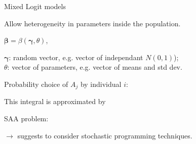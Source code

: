 \documentclass{beamer}
\def\bxi{\boldsymbol\xi}
\begin{document}

	\begin{frame}{Mixed Logit models}
		
		\begin{footnotesize}
			Allow {\red heterogeneity} in parameters inside the population.
			\begin{center}
				$\boldsymbol{\beta} = \beta(\boldsymbol{\gamma}, \theta)$,
			\end{center}
			$\boldsymbol{\gamma}$: {\blue random vector}, e.g. vector of independant
			$N(0,1)$);\\
			$\theta$: {\blue vector of parameters}, e.g. vector of means and std dev.
			
				Probability choice of $A_j$ by individual $i$:
				\begin{center}
					\psframebox[fillstyle=solid, fillcolor=lightgray]{
						$P_{ij} (\theta) = E_{\bxi} \left[ L_{ij} (\gamma, \theta)\ \right] =
						\int { L_{ij} (\gamma, \theta)} f(\gamma) d\gamma$
					}
				\end{center}
				
				This integral is approximated by
				\begin{center}
				\end{center}

				{\red SAA} problem:
				\begin{center}
				\end{center}
			
				$\rightarrow$ suggests to consider {\blue stochastic programming}
				techniques.
			
		\end{footnotesize}
		
\end{frame}
\end{document}
